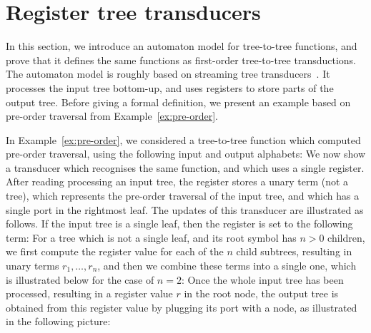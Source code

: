 


\section{Register tree transducers}
\label{sec:stt}
In this section, we introduce an automaton model for tree-to-tree functions, and prove that it defines the same functions as first-order tree-to-tree transductions. 
The automaton model is roughly based on streaming tree transducers~\cite{alur2017streaming}.
It processes the input tree bottom-up, and uses registers to store parts of the output tree.
Before giving a formal definition, we present an example based on  pre-order traversal from Example~\ref{ex:pre-order}.
\begin{example}\label{ex:preorder-register} In Example~\ref{ex:pre-order}, we considered a tree-to-tree function which computed pre-order traversal, using the following input and output alphabets:
We now show a transducer which recognises the same function, and which uses  a single register.  After reading processing an input tree, the register stores a unary term (not a tree), which represents the pre-order traversal of the  input tree, and which has a single port in the rightmost leaf. The updates of this transducer are illustrated as follows. If the input tree is a single leaf, then the register is set to the following term:
    For a tree which is not a single leaf, and its root symbol has $n>0$ children, we first compute the register value  for each of the $n$  child subtrees, resulting in unary terms $r_1,\ldots,r_n$,  and then we combine these terms into a single one, which is illustrated below for the case of $n=2$:
    Once the whole input tree has been processed, resulting in a register value $r$ in the root node, the output tree is obtained from this register value by plugging its port with a node, as illustrated in the following picture:
\end{example}




